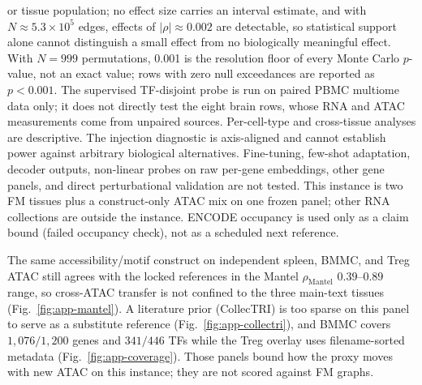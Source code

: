 \documentclass[fleqn,10pt,lineno]{wlpeerj}
\begin{document}
or tissue population; no effect size carries an interval estimate, and with
$N\approx5.3\times10^{5}$ edges, effects of $|\rho|\approx0.002$ are detectable, so statistical
support alone cannot distinguish a small effect from no biologically meaningful effect. With
$N=999$ permutations, 0.001 is the resolution floor of every Monte Carlo $p$-value, not an exact
value; rows with zero null exceedances are reported as $p<0.001$. The
supervised TF-disjoint probe is run on paired PBMC multiome data only; it does not directly
test the eight brain rows, whose RNA and ATAC measurements come from unpaired sources.
Per-cell-type and cross-tissue analyses are descriptive. The injection diagnostic is axis-aligned
and cannot establish power against arbitrary biological alternatives. Fine-tuning, few-shot
adaptation, decoder outputs, non-linear probes on raw per-gene embeddings, other gene panels, and
direct perturbational validation are not tested. This instance is two FM tissues plus a
construct-only ATAC mix on one frozen panel; other RNA collections are outside the instance.
ENCODE occupancy is used only as a claim bound (failed occupancy check), not as a scheduled next
reference.

The same accessibility/motif construct on independent spleen, BMMC, and Treg ATAC still agrees with the locked references in the Mantel $\rho_{\mathrm{Mantel}}$ $0.39$--$0.89$ range, so cross-ATAC transfer is not confined to the three main-text tissues (Fig.~\ref{fig:app-mantel}). A literature prior (CollecTRI) is too sparse on this panel to serve as a substitute reference (Fig.~\ref{fig:app-collectri}), and BMMC covers $1{,}076/1{,}200$ genes and $341/446$ TFs while the Treg overlay uses filename-sorted metadata (Fig.~\ref{fig:app-coverage}). Those panels bound how the proxy moves with new ATAC on this instance; they are not scored against FM graphs.
\end{document}

